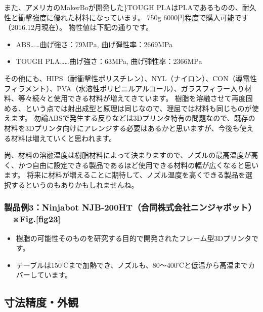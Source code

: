 また、アメリカのMakerBoが開発した\}TOUGH
PLA\cite{tough-pla}はPLAであるものの、耐久性と衝撃強度に優れた材料になっています。
750g 6000円程度で購入可能です（2016.12月現在）。
物性値は下記の通りです。

\begin{itemize}
\tightlist
\item
  ABS\ldots{}\ldots{}曲げ強さ：79MPa, 曲げ弾性率：2669MPa
\item
  TOUGH PLA\ldots{}\ldots{}曲げ強さ：63MPa, 曲げ弾性率：2366MPa
\end{itemize}

その他にも、HIPS（耐衝撃性ポリスチレン）、NYL（ナイロン）、CON（導電性フィラメント）、PVA（水溶性ポリビニルアルコール）、ガラスフィラー入り材料、等々続々と使用できる材料が増えてきています。
樹脂を溶融させて再度固める、という点では射出成型と原理は同じなので、理屈では材料も同じものが使えます。
勿論ABSで発生する反りなどは3Dプリンタ特有の問題なので、既存の材料を3Dプリンタ向けにアレンジする必要はあるかと思いますが、今後も使える材料は増えていくと思われます。

尚、材料の溶融温度は樹脂材料によって決まりますので、ノズルの最高温度が高く、かつ自由に設定できる製品であるほど使用できる材料の幅が広くなると思います。
将来に材料が増えることに期待して、ノズル温度を高くできる製品を選択するというのもありかもしれませんね。

\subsubsection{\texorpdfstring{製品例3：Ninjabot
NJB-200HT（合同株式会社ニンジャボット）
　※Fig.\ref{fig23}}{製品例3：Ninjabot NJB-200HT（合同株式会社ニンジャボット） 　※Fig.}}\label{ux88fdux54c1ux4f8b3ninjabot-njb-200htux5408ux540cux682aux5f0fux4f1aux793eux30cbux30f3ux30b8ux30e3ux30dcux30c3ux30c8-fig.}

\begin{itemize}
\tightlist
\item
  樹脂の可能性そのものを研究する目的で開発されたフレーム型3Dプリンタです。
\item
  テーブルは150℃まで加熱でき、ノズルも、80～400℃と低温から高温までカバーしています。
\end{itemize}

\subsection{寸法精度・外観}\label{ux5bf8ux6cd5ux7cbeux5ea6ux5916ux89b3}

